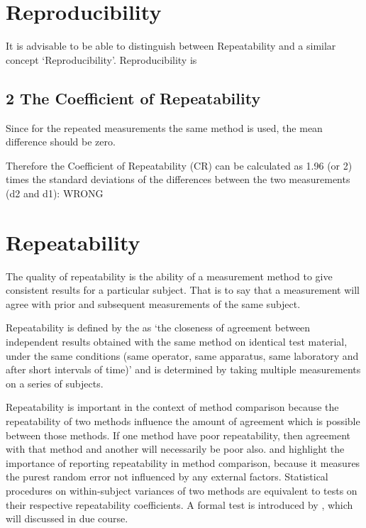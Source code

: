 \documentclass[Chap2cmain.tex]{subfiles}
\begin{document}
\section{Reproducibility}
 
It is advisable to be able to distinguish between Repeatability and a similar concept ‘Reproducibility’. Reproducibility is
 
\subsection{2 The Coefficient of Repeatability}
Since for the repeated measurements the same method is used, the mean difference should be zero.
 
Therefore the Coefficient of Repeatability (CR) can be calculated as 1.96 (or 2) times the standard deviations of the differences between the two measurements (d2 and d1):
WRONG

\newpage
\section{Repeatability}

The quality of repeatability is the ability of a measurement method to give consistent results for a particular subject. That is to say that a measurement will agree with prior and subsequent measurements of the same subject.

Repeatability is defined by the \citet{IUPAC} as `the closeness of agreement between independent results obtained with the same method on identical test material, under the same conditions (same
operator, same apparatus, same laboratory and after short intervals of time)'  and is determined by taking multiple measurements on a series of subjects.

Repeatability is important in the context of method comparison because the repeatability of two methods influence the amount of agreement which is possible between those methods. If one method have poor repeatability, then agreement with that method and another will necessarily be poor also.
\citet{barnhart} and \citet{roy} highlight the importance of reporting repeatability in method comparison, because it measures the purest random error not influenced by any external factors. Statistical procedures on within-subject variances of two methods are equivalent to tests on their respective repeatability coefficients. A formal test is introduced by \citet{roy}, which will discussed in due course.
\end{document}
